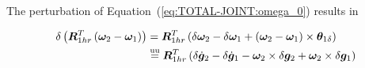 \documentclass[10pt,fleqn,subeqn]{report}
\newcommand{\T}[1]{\bm{#1}}
\newcommand{\TT}[1]{\bm{#1}}
\newcommand{\equu}{\overset{\text{uu}}{=}}
\begin{document}
The perturbation of Equation~(\ref{eq:TOTAL-JOINT:omega_0}) results in
\begin{comment}
\begin{align}
	\delta\T{\omega}^{\delta}
	&= \T{R}_{1hr}^T \plbr{
		\delta\T{\omega}_2
		- \delta\T{\omega}_1
		+ \plbr{\T{\omega}_2 - \T{\omega}_1}\times\T{\theta}_{1\delta}
	} - \T{\theta}_{\delta}^{\delta}\times\T{R}^{\delta}\T{\omega}_0 \nonumber \\
	&= \T{R}_{1hr}^T \plbr{
		\delta\T{\omega}_2
		- \delta\T{\omega}_1
		+ \plbr{\T{\omega}_2 - \T{\omega}_1}\times\T{\theta}_{1\delta}
	} \nonumber \\
	& \mbox{\hspace{12pt}}
	+ \plbr{\T{R}^{\delta}\T{\omega}_0}\times \T{R}_{1hr}^T \plbr{
		\T{\theta}_{2\delta}
		- \T{\theta}_{1\delta}
	} \nonumber \\
	&= \T{R}_{1hr}^T \plbr{
		\delta\T{\omega}_2
		- \delta\T{\omega}_1
	} + \plbr{\T{R}^{\delta}\T{\omega}_0}\times \T{R}_{1hr}^T \T{\theta}_{2\delta}
	\nonumber \\
	& \mbox{\hspace{12pt}}
	+ \plbr{
		\T{R}_{1hr}^T \plbr{\T{\omega}_2 - \T{\omega}_1}\times{}
		- \plbr{\T{R}^{\delta}\T{\omega}_0}\times \T{R}_{1hr}^T
	} \T{\theta}_{1\delta}
	\nonumber \\
	&= \T{R}_{1hr}^T \plbr{
		\delta\T{\omega}_2
		- \delta\T{\omega}_1
	} + \plbr{\T{R}^{\delta}\T{\omega}_0}\times \T{R}_{1hr}^T \T{\theta}_{2\delta}
	+ \T{\omega}^{\delta} \times \T{R}_{1hr}^T \T{\theta}_{1\delta} .
\end{align}
After applying the updated-updated approximations, it becomes
\begin{align}
	\delta\T{\omega}^{\delta}
	&\equu
	\T{R}_{1hr}^T \delta\dot{\T{g}}_2
	-
	\T{R}_{1hr}^T \delta\dot{\T{g}}_1
	-
	\plbr{
		\T{R}_{1hr}^T \T{\omega}_2\times{}
		-
		\T{\omega}_0\times\T{R}_{1hr}^T
	} \delta\T{g}_2
	+
	\T{R}_{1hr}^T \T{\omega}_1\times \delta\T{g}_1
	.
\end{align}
\end{comment}
\begin{align}
	\delta\plbr{
		\TT{R}_{1hr}^T \plbr{
			\T{\omega}_2 - \T{\omega}_1
		}
	}
	&=
	\TT{R}_{1hr}^T \plbr{
		\delta \T{\omega}_2
		-
		\delta \T{\omega}_1
		+
		\plbr{
			\T{\omega}_2 - \T{\omega}_1
		} \times \T{\theta}_{1\delta}
	}
	\nonumber \\
	&\equu
	\TT{R}_{1hr}^T \plbr{
		\delta\dot{\T{g}}_2
		-
		\delta\dot{\T{g}}_1
		-
		\T{\omega}_2 \times \delta\T{g}_2
		+
		\T{\omega}_2 \times \delta\T{g}_1
	}
\end{align}
\end{document}
